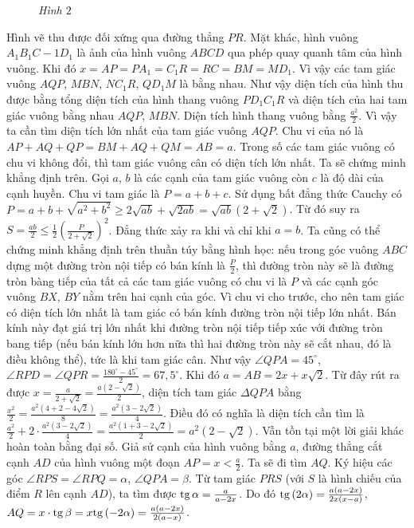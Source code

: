 \begin{multicols}{2}
\begin{figure}[H]
		\caption{\small\textit{\color{cackithi}Hình $2$}}
		\vspace*{-10pt}
	\end{figure}
	Hình vẽ thu được đối xứng qua đường thẳng $PR$. Mặt khác, hình vuông $A_1B_1C-1D_1$ là ảnh của hình vuông $ABCD$ qua phép quay quanh tâm của hình vuông. Khi đó  $x = AP = P{A_1} = {C_1}R = RC = BM = M{D_1}$. Vì vậy các tam giác vuông  $AQP$,  $MBN$,  $NC_1R$, $QD_1M$ là bằng nhau. 
	\vskip 0.1cm
	Như vậy diện tích của hình thu được bằng tổng diện tích của hình thang vuông $PD_1C_1R$ và diện tích của hai tam giác vuông bằng nhau  $AQP$,  $MBN$. Diện tích hình thang vuông bằng  $\frac{a^2}{2}$. Vì vậy ta cần tìm diện tích lớn nhất của tam giác vuông $AQP$. Chu vi của nó là $AP + AQ + QP = BM + AQ + QM = AB = a$. Trong số các tam giác vuông có chu vi không đổi, thì tam giác vuông cân có diện tích lớn nhất.
	\vskip 0.1cm
	Ta sẽ chứng minh khẳng định trên. Gọi $a$, $b$ là các cạnh của tam giác vuông còn $c$ là độ dài của cạnh huyền. Chu vi tam giác là $P = a + b + c$. Sử dụng bất đẳng thức Cauchy có $P = a + b + \sqrt {{a^2} + {b^2}}  \ge 2\sqrt {ab}  + \sqrt {2ab}  = \sqrt {ab} \left( {2 + \sqrt 2 } \right)$. Từ đó suy ra $S = \frac{{ab}}{2} \le \frac{1}{2}{\left( {\frac{P}{{2 + \sqrt 2 }}} \right)^2}$. Đẳng thức xảy ra khi và chỉ khi $a = b$.
	\vskip 0.1cm 
	Ta cũng có thể chứng minh khẳng định trên thuần túy bằng hình học: nếu trong góc vuông $ABC$ dựng một đường tròn nội tiếp có bán kính là $\frac{P}{2}$, thì đường tròn này sẽ là đường tròn bàng tiếp của tất cả các tam giác vuông có chu vi là $P$ và các cạnh góc vuông $BX$, $BY$ nằm trên hai cạnh của góc. Vì chu vi cho trước, cho nên tam giác có diện tích lớn nhất là tam giác có bán kính đường tròn nội tiếp lớn nhất. Bán kính này đạt giá trị lớn nhất khi đường tròn nội tiếp tiếp xúc với đường tròn bang tiếp (nếu bán kính lớn hơn nữa thì hai đường tròn này sẽ cắt nhau, đó là điều không thể), tức là khi tam giác cân. 
	Như vậy  $\angle QPA = 45^\circ$, $\angle RPD = \angle QPR = \frac{180^\circ - 45^\circ}{2} = 67,5^\circ$. Khi đó $a = AB = 2x + x\sqrt 2 $. Từ đây rút ra được $x = \frac{a}{{2 + \sqrt 2 }} = \frac{{a\left( {2 - \sqrt 2 } \right)}}{2}$, diện tích tam giác $\Delta QPA$  bằng $\frac{{{x^2}}}{2} = \frac{{{a^2}\left( {4 + 2 - 4\sqrt 2 } \right)}}{8} = \frac{{{a^2}\left( {3 - 2\sqrt 2 } \right)}}{4}$. Điều đó có nghĩa là diện tích cần tìm là $\frac{{{a^2}}}{2} + 2 \cdot \frac{{{a^2}\left( {3 - 2\sqrt 2 } \right)}}{4} = \frac{{{a^2}\left( {1 + 3 - 2\sqrt 2 } \right)}}{2} = {a^2}\left( {2 - \sqrt 2 } \right)$.
	\vskip 0.1cm 
	Vẫn tồn tại một lời giải khác hoàn toàn bằng đại số. Giả sử cạnh của hình vuông bằng $a$, đường thẳng cắt cạnh $AD$ của hình vuông một đoạn  $AP = x < \frac{a}{2}$. Ta sẽ đi tìm $AQ$. Ký hiệu các góc $\angle RPS = \angle RPQ = \alpha $, $\angle QPA = \beta$. Từ tam giác $PRS$ (với $S$ là hình chiếu của điểm $R$ lên cạnh $AD$), ta tìm được ${\rm{tg}}\,\alpha  = \frac{a}{{a - 2x}}$. Do đó  ${\rm{tg}}\,(2\alpha ) = \frac{{a(a - 2x)}}{{2x(x - a)}}$,  $AQ = x \cdot {\rm{tg}}\,\beta  = x{\rm{tg}}\,( - 2\alpha ) = \frac{{a(a - 2x)}}{{2(a - x)}}$.

\end{multicols}
